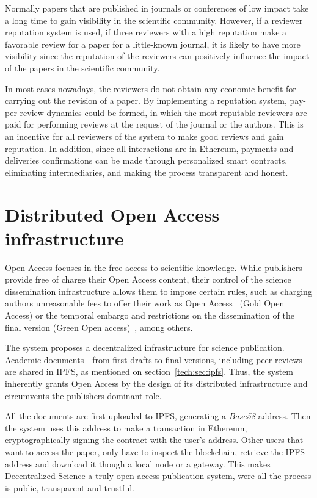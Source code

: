 \begin{itemize}
   Normally papers
  that are published in journals or conferences of low impact take a long time
  to gain visibility in the scientific community. However, if a reviewer
  reputation system is used, if three reviewers with a high reputation make a
  favorable review for a paper for a little-known journal, it is likely to have
  more visibility since the reputation of the reviewers can positively influence
  the impact of the papers in the scientific community.
  
   In most cases nowadays, the reviewers do not obtain any
  economic benefit for carrying out the revision of a paper. By implementing a
  reputation system, pay-per-review dynamics could be formed, in which the most
  reputable reviewers are paid for performing reviews at the request of the
  journal or the authors. This is an incentive for all reviewers of the system
  to make good reviews and gain reputation. In addition, since all interactions
  are in Ethereum, payments and deliveries confirmations can be made through
  personalized smart contracts, eliminating intermediaries, and making the
  process transparent and honest.
 
\end{itemize}


\section{Distributed Open Access infrastructure}
\label{distributedOA}
Open Access focuses in the free access to scientific knowledge. While publishers
provide free of charge their Open Access content, their control of the science
dissemination infrastructure allows them to impose certain rules, such as
charging authors unreasonable fees to offer their work as Open
Access~\cite{solomon2012study} (Gold Open Access) or the temporal embargo and
restrictions on the dissemination of the final version (Green Open
access)~\cite{bjork2014anatomy}, among others.

The system proposes a decentralized infrastructure for science publication.
Academic documents - from first drafts to final versions, including peer
reviews- are shared in IPFS, as mentioned on section~\ref{tech:sec:ipfs}. Thus,
the system inherently grants Open Access by the design of its distributed
infrastructure and circumvents the publishers dominant role.

All the documents are first uploaded to IPFS, generating a \emph{Base58}
address. Then the system uses this address to make a transaction in Ethereum,
cryptographically signing the contract with the user's address. Other users that
want to access the paper, only have to inspect the blockchain, retrieve the IPFS
address and download it though a local node or a gateway. This makes
Decentralized Science a truly open-access publication system, were all the
process is public, transparent and trustful.




